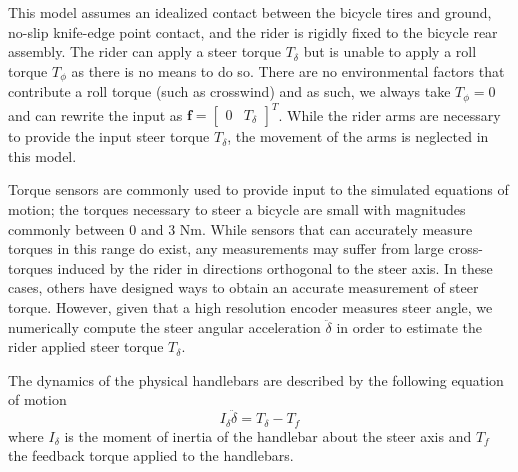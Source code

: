 \documentclass[11pt,a4paper,reqno]{amsart}
\newcommand{\roll}{\phi}
\newcommand{\steer}{\delta}
\begin{document}
This model assumes an idealized contact between the bicycle tires and ground, no-slip knife-edge point contact,
and the rider is rigidly fixed to the bicycle rear assembly.
The rider can apply a steer torque $ T_\steer $ but is unable to apply a roll torque $ T_\roll $ as there is no means to
do so.
There are no environmental factors that contribute a roll torque (such as crosswind) and as such,
we always take $ T_\roll = 0 $ and can rewrite the input as $ \bm{f} = \begin{bmatrix} 0  & T_\steer \end{bmatrix}^T $.
While the rider arms are necessary to provide the input steer torque $ T_\steer $, the movement of the arms is
neglected in this model.

Torque sensors are commonly used to provide input to the simulated equations of motion\cite{FIXME}; the torques
necessary to steer a bicycle are small with magnitudes commonly between 0 and 3 Nm\cite{moore2012}.
While sensors that can accurately measure torques in this range do exist, any measurements may suffer from large
cross-torques induced by the rider in directions orthogonal to the steer axis.
In these cases, others have designed ways to obtain an accurate measurement of steer torque\cite{moore2012}.
However, given that a high resolution encoder measures steer angle, we numerically compute the steer
angular acceleration $ \ddot{\steer} $ in order to estimate the rider applied steer torque $ T_\steer $.

The dynamics of the physical handlebars are described by the following equation of motion
\begin{equation}
    I_\steer \ddot{\steer} = T_\steer- T_f \label{eq:handlebar_eom}
\end{equation}
where $ I_\steer $ is the moment of inertia of the handlebar about the steer axis and $ T_f $ the feedback torque
applied to the handlebars.
\end{document}
